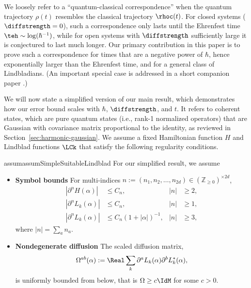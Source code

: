 \documentclass{article}
\numberwithin{equation}{section}
\begin{document}
We loosely refer to a ``quantum-classical correspondence'' when the quantum trajectory $\rho(t)$ resembles the classical trajectory $\rhoc(t)$.  For closed systems ($\diffstrength=0$), such a correspondence only lasts until the Ehrenfest time $\teh \sim \log(\hbar^{-1})$, while for open systems with $\diffstrength$ sufficiently large it is conjectured to last much longer. Our primary contribution in this paper is to prove such a correspondence for times that are a negative power of $\hbar$, hence exponentially larger than the Ehrenfest time, and for a general class of Lindbladians.  (An important special case is addressed in a short companion paper \cite{hernandez2023decoherence1}.)







We will now state a simplified version of our main result,
which demonstrates how our error bound scales with $\hbar$, $\diffstrength$, and $t$. It refers to coherent states, which are pure quantum states (i.e., rank-1 normalized operators) that are Gaussian with covariance matrix proportional to the identity, as reviewed in Section~\ref{sec:harmonic-gaussian}. We assume a fixed Hamiltonian function $H$ and Lindblad functions $\LCk$ that satisfy the following regularity conditions.
\begin{restatable}{assum}{assumSimpleSuitableLindblad}
    \label{assum:simpleSuitableLindblad}
    For our simplified result, we assume
    \begin{itemize}
    \item \textbf{Symbol bounds}
    For multi-indices $n:=(n_1,n_2,\ldots,n_{2d}) \in (\mathbb{Z}_{\ge 0})^{\times 2d}$,
    \begin{align}
    |\partial^n H(\alpha)| &\leq C_n, & |n| &\geq 2,\\
    |\partial^n L_k(\alpha)| &\leq C_n, & |n|&\geq 1,\\
    |\partial^n L_k(\alpha)| &\leq C_n (1+|\alpha|)^{-1}, &  |n|&\geq 3,
    \end{align}
    where $|n|=\sum_a n_a$.
    \item \textbf{Nondegenerate diffusion}  The scaled diffusion matrix,
    \[
    \Omega^{ab}(\alpha) := \Real \sum_k \partial^a L_k(\alpha) \partial^bL_k^*(\alpha),
    \]
    is uniformly bounded from below, that is $\Omega\geq c\IdM$ for some $c>0$. 
    \end{itemize}
\end{restatable}
\end{document}
